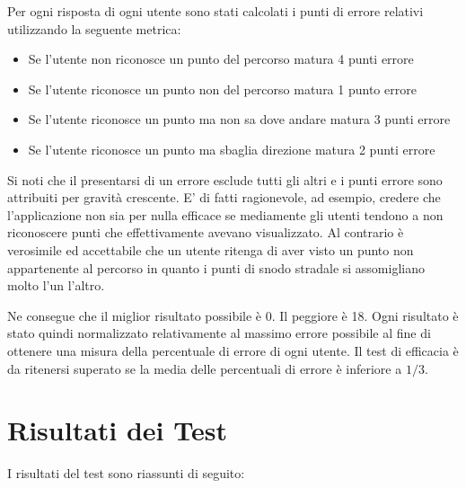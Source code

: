 \documentclass[12pt,a4paper,openright, notitlepage]{report}
\begin{document}
Per ogni risposta di ogni utente sono stati calcolati i punti di errore relativi utilizzando la seguente metrica:

\begin{itemize}
	\item Se l’utente non riconosce un punto del percorso matura 4 punti errore
	\item Se l’utente riconosce un punto non del percorso matura 1 punto errore
	\item Se l’utente riconosce un punto ma non sa dove andare matura 3 punti errore
	\item Se l’utente riconosce un punto ma sbaglia direzione matura 2 punti errore
\end{itemize}

Si noti che il presentarsi di un errore esclude tutti gli altri e i punti errore sono attribuiti per gravità crescente. E’ di fatti ragionevole, ad esempio, credere che l’applicazione non sia per nulla efficace se mediamente gli utenti tendono a non riconoscere punti che effettivamente avevano visualizzato. Al contrario è verosimile ed accettabile che un utente ritenga di aver visto un punto non appartenente al percorso in quanto i punti di snodo stradale si assomigliano molto l’un l’altro.

Ne consegue che il miglior risultato possibile è 0. Il peggiore è 18. Ogni risultato è stato quindi normalizzato relativamente al massimo errore possibile al fine di ottenere una misura della percentuale di errore di ogni utente. Il test di efficacia è da ritenersi superato se la media delle percentuali di errore è inferiore a $1/3$.

\section{Risultati dei Test}

I risultati del test sono riassunti di seguito:
\end{document}
